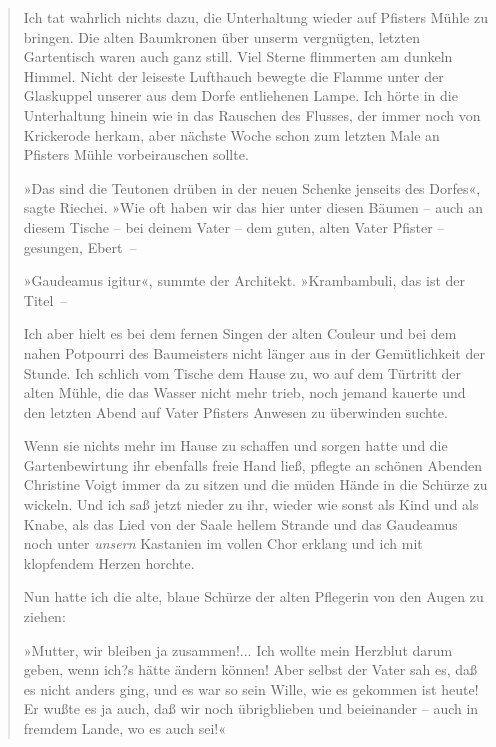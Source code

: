 \begin{verse}
Ich tat wahrlich nichts dazu, die Unterhaltung wieder auf Pfisters
Mühle zu bringen. Die alten Baumkronen über unserm vergnügten,
letzten Gartentisch waren auch ganz still. Viel Sterne flimmerten
am dunkeln Himmel. Nicht der leiseste Lufthauch bewegte die Flamme
unter der Glaskuppel unserer aus dem Dorfe entliehenen Lampe. Ich
hörte in die Unterhaltung hinein wie in das Rauschen des Flusses,
der immer noch von Krickerode herkam, aber nächste Woche schon zum
letzten Male an Pfisters Mühle vorbeirauschen sollte.

»Das sind die Teutonen drüben in der neuen Schenke jenseits des
Dorfes«, sagte Riechei. »Wie oft haben wir das hier unter diesen
Bäumen – auch an diesem Tische – bei deinem Vater – dem guten,
alten Vater Pfister – gesungen, Ebert~–

»Gaudeamus igitur«, summte der Architekt. »Krambambuli, das ist der
Titel~–

Ich aber hielt es bei dem fernen Singen der alten Couleur und bei
dem nahen Potpourri des Baumeisters nicht länger aus in der
Gemütlichkeit der Stunde. Ich schlich vom Tische dem Hause zu, wo
auf dem Türtritt der alten Mühle, die das Wasser nicht mehr trieb,
noch jemand kauerte und den letzten Abend auf Vater Pfisters
Anwesen zu überwinden suchte.

Wenn sie nichts mehr im Hause zu schaffen und sorgen hatte und die
Gartenbewirtung ihr ebenfalls freie Hand ließ, pflegte an schönen
Abenden Christine Voigt immer da zu sitzen und die müden Hände in
die Schürze zu wickeln. Und ich saß jetzt nieder zu ihr, wieder wie
sonst als Kind und als Knabe, als das Lied von der Saale hellem
Strande und das Gaudeamus noch unter \emph{unsern} Kastanien im
vollen Chor erklang und ich mit klopfendem Herzen horchte.

Nun hatte ich die alte, blaue Schürze der alten Pflegerin von den
Augen zu ziehen:

»Mutter, wir bleiben ja zusammen!... Ich wollte mein Herzblut darum
geben, wenn ich?s hätte ändern können! Aber selbst der Vater sah
es, daß es nicht anders ging, und es war so sein Wille, wie es
gekommen ist heute! Er wußte es ja auch, daß wir noch übrigblieben
und beieinander – auch in fremdem Lande, wo es auch sei!«


\end{verse}
